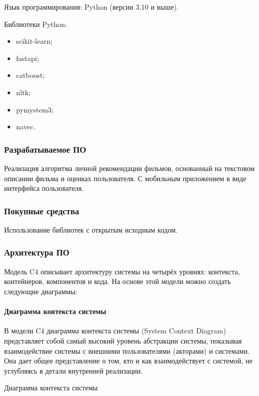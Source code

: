 Язык программирования: Python (версии 3.10 и выше).

Библиотеки Python:

\begin{itemize}
	\item scikit-learn;
	\item fastapi;
	\item catboost;
	\item nltk;
	\item pymystem3;
	\item navec.
\end{itemize}

\subsubsection{Разрабатываемое ПО}

Реализация алгоритма личной рекомендации фильмов, основанный на текстовом описании фильма и оценках пользователя.
С мобильным приложением в виде интерфейса пользователя.

\subsubsection{Покупные средства}

Использование библиотек с открытым исходным кодом.

\subsubsection{Архитектура ПО}

Модель C4 описывает архитектуру системы на четырёх уровнях:
контекста, контейнеров, компонентов и кода.
На основе этой модели можно создать следующие диаграммы:

\paragraph{Диаграмма контекста системы}

В модели C4 диаграмма контекста системы (System Context Diagram)
представляет собой самый высокий уровень абстракции системы,
показывая взаимодействие системы с внешними пользователями (акторами)
и системами. Она дает общее представление о том,
кто и как взаимодействует с системой,
не углубляясь в детали внутренней реализации.
   
\begin{image}
	\caption{Диаграмма контекста системы}
	\label{fig:c4:system:context}
\end{image}

